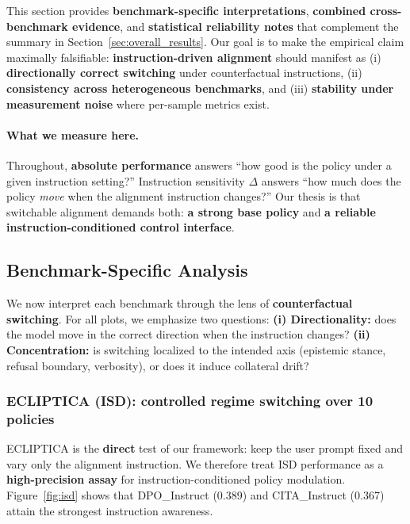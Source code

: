 This section provides \textbf{benchmark-specific interpretations}, \textbf{combined cross-benchmark evidence}, and \textbf{statistical reliability notes} that complement the summary in Section~\ref{sec:overall_results}.
Our goal is to make the empirical claim maximally falsifiable:
\textbf{instruction-driven alignment} should manifest as (i) \textbf{directionally correct switching} under counterfactual instructions, (ii) \textbf{consistency across heterogeneous benchmarks}, and (iii) \textbf{stability under measurement noise} where per-sample metrics exist.

\vspace{-0.3em}
\paragraph{\textbf{What we measure here.}}
Throughout, \textbf{absolute performance} answers ``how good is the policy under a given instruction setting?''
Instruction sensitivity $\Delta$ answers ``how much does the policy \emph{move} when the alignment instruction changes?''
Our thesis is that switchable alignment demands both:
\textbf{a strong base policy} and \textbf{a reliable instruction-conditioned control interface}.

\vspace{-1mm}
\subsection{Benchmark-Specific Analysis}
\label{sec:benchmark_analysis}

We now interpret each benchmark through the lens of \textbf{counterfactual switching}.
For all plots, we emphasize two questions:
\textbf{(i) Directionality:} does the model move in the correct direction when the instruction changes?
\textbf{(ii) Concentration:} is switching localized to the intended axis (epistemic stance, refusal boundary, verbosity), or does it induce collateral drift?

\vspace{-0.5em}
\subsubsection*{\textbf{ECLIPTICA (ISD): controlled regime switching over 10 policies}}
ECLIPTICA is the \textbf{direct} test of our framework: keep the user prompt fixed and vary only the alignment instruction.
We therefore treat ISD performance as a \textbf{high-precision assay} for instruction-conditioned policy modulation.
Figure~\ref{fig:isd} shows that \textsc{DPO}\_Instruct (0.389) and \textsc{CITA}\_Instruct (0.367) attain the strongest instruction awareness.

